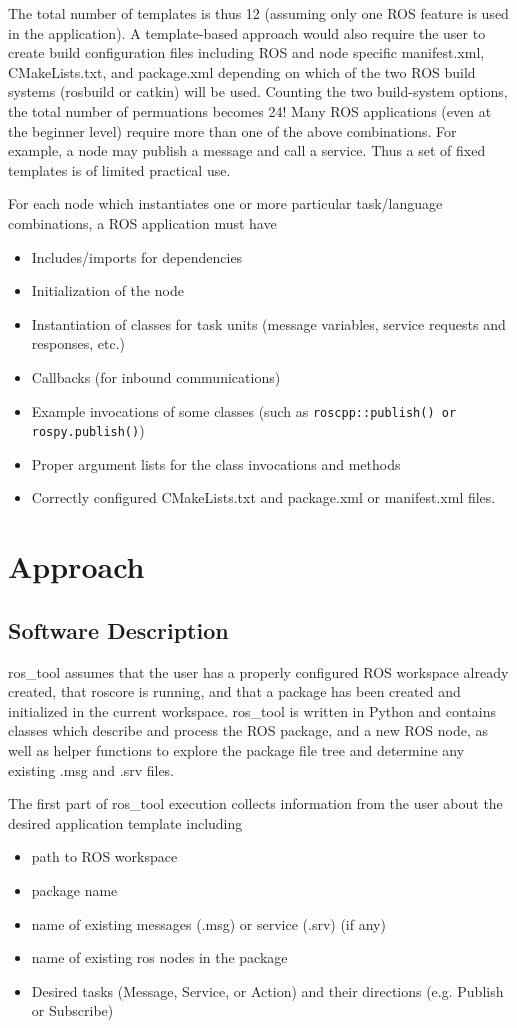 \documentclass[letterpaper, 10 pt, conference]{ieeeconf}  %
\begin{document}
The total number of templates is thus 12 (assuming only one ROS feature is used in the application).  A template-based approach would also require the  user to create build configuration files including ROS and node specific manifest.xml, CMakeLists.txt, and package.xml depending on which of the two ROS build systems (rosbuild  or catkin) will be used.  Counting the two build-system options, the total number of permuations becomes 24!
Many ROS applications (even at the beginner level) require more than one of the above combinations.  For example, a node may publish a message and call a service.  Thus a set of fixed templates is of limited practical use.

For each node which instantiates one or more particular task/language combinations, a ROS application must have
\begin{itemize}
  \item Includes/imports for dependencies
  \item Initialization of the node
  \item Instantiation of classes for task units (message variables, service requests and responses, etc.)
  \item Callbacks (for inbound communications)
  \item Example invocations of some classes (such as {\tt roscpp::publish() or rospy.publish()})
  \item Proper argument lists for the class invocations and methods
  \item Correctly configured CMakeLists.txt and package.xml or manifest.xml files.
\end{itemize}


\section{Approach}
\subsection{Software Description}

ros\_tool assumes that the user has a properly configured ROS workspace already created, that roscore is running, and that a package has been created and initialized in the current workspace.   ros\_tool is written in Python and contains classes which describe and process the ROS package, and a new ROS node, as well as helper functions to explore the package file tree and determine any existing .msg and .srv files.

The first part of ros\_tool execution collects information from the user about the desired application template including
\begin{itemize}
  \item path to ROS workspace
  \item package name
  \item name of existing messages (.msg) or service (.srv) (if any)
  \item name of existing ros nodes in the package
  \item Desired tasks (Message, Service, or Action) and their directions (e.g. Publish or Subscribe)
\end{itemize}
\end{document}
